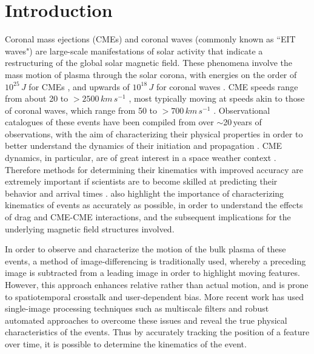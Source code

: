 \documentclass[structabstract]{aa}
\begin{document}
\maketitle

%

\section{Introduction}
\label{sect_intro}

Coronal mass ejections (CMEs) and coronal waves (commonly known as ``EIT waves") are large-scale manifestations of solar activity that indicate a restructuring of the global solar magnetic field. These phenomena involve the mass motion of plasma through the solar corona, with energies on the order of $10^{25}\,J$ for CMEs \citep{2004JGRA..10910104E}, and upwards of $10^{18}\,J$ for coronal waves \citep{2005ApJ...633L.145B}. CME speeds range from about 20 to $>$$2500\,km\,s^{-1}$ \citep{2004JGRA..10907105Y}, most typically moving at speeds akin to those of coronal waves, which range from 50 to $>$$700\,km\,s^{-1}$ \citep{2009ApJS..183..225T}. Observational catalogues of these events have been compiled from over $\sim$20\,years of observations, with the aim of characterizing their physical properties in order to better understand the dynamics of their initiation and propagation \citep[see some recent reviews by][]{2011SSRv..158..365G,2012SoPh..tmp...93P,2011ASSL..376.....H,2012LRSP....9....3W}. CME dynamics, in particular, are of great interest in a space weather context \citep[e.g.,][]{SWE:SWE493, 2010heliophysics, 2005A&A...440..373H}. Therefore methods for determining their kinematics with improved accuracy are extremely important if scientists are to become skilled at predicting their behavior and arrival times \citep[see, for example, efforts by][]{2010NatCo...1E..74B, 2005AnGeo..23.1033S, 2004Natur.432...78P}. \citet{2012ApJ...749...57T} also highlight the importance of characterizing kinematics of events as accurately as possible, in order to understand the effects of drag and CME-CME interactions, and the subsequent implications for the underlying magnetic field structures involved.

In order to observe and characterize the motion of the bulk plasma of these events, a method of image-differencing is traditionally used, whereby a preceding image is subtracted from a leading image in order to highlight moving features. However, this approach enhances relative rather than actual motion, and is prone to spatiotemporal crosstalk and user-dependent bias. More recent work has used single-image processing techniques such as multiscale filters \citep{2011AdSpR..47.2118G, 2009A&A...495..325B, 2008SoPh..248..457Y} and robust automated approaches \citep[e.g.,][]{2012ApJ...752..145B, 2012SoPh..276..479P, 2011A&A...531A..42L} to overcome these issues and reveal the true physical characteristics of the events. Thus by accurately tracking the position of a feature over time, it is possible to determine the kinematics of the event. 
\end{document}
